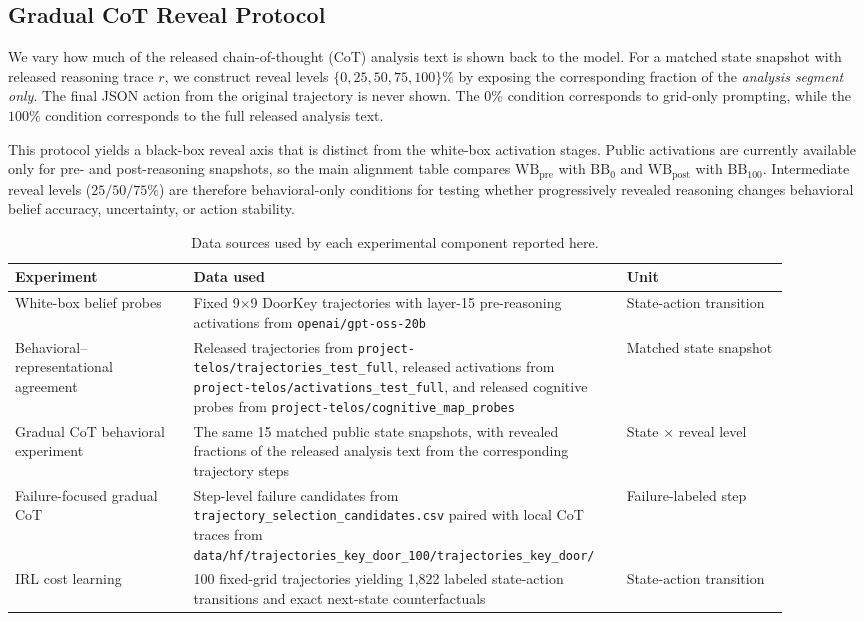 \documentclass[final]{sparreport}
\begin{document}
\subsection{Gradual CoT Reveal Protocol}
We vary how much of the released chain-of-thought (CoT) analysis text is shown back to the model. For a matched state snapshot with released reasoning trace $r$, we construct reveal levels $\{0,25,50,75,100\}\%$ by exposing the corresponding fraction of the \emph{analysis segment only}. The final JSON action from the original trajectory is never shown. The $0\%$ condition corresponds to grid-only prompting, while the $100\%$ condition corresponds to the full released analysis text.

This protocol yields a black-box reveal axis that is distinct from the white-box activation stages. Public activations are currently available only for pre- and post-reasoning snapshots, so the main alignment table compares $\mathrm{WB}_{\text{pre}}$ with $\mathrm{BB}_{0}$ and $\mathrm{WB}_{\text{post}}$ with $\mathrm{BB}_{100}$. Intermediate reveal levels ($25/50/75\%$) are therefore behavioral-only conditions for testing whether progressively revealed reasoning changes behavioral belief accuracy, uncertainty, or action stability.

\begin{table}[t]
\centering
\small
\caption{Data sources used by each experimental component reported here.}
\label{tab:behavioral_data_sources}
\begin{tabular}{p{0.22\linewidth}p{0.48\linewidth}p{0.20\linewidth}}
\toprule
\textbf{Experiment} & \textbf{Data used} & \textbf{Unit} \\
\midrule
White-box belief probes & Fixed 9$\times$9 DoorKey trajectories with layer-15 pre-reasoning activations from \texttt{openai/gpt-oss-20b} & State-action transition \\
Behavioral--representational agreement & Released trajectories from \texttt{project-telos/trajectories\_test\_full}, released activations from \texttt{project-telos/activations\_test\_full}, and released cognitive probes from \texttt{project-telos/cognitive\_map\_probes} & Matched state snapshot \\
Gradual CoT behavioral experiment & The same 15 matched public state snapshots, with revealed fractions of the released analysis text from the corresponding trajectory steps & State $\times$ reveal level \\
Failure-focused gradual CoT & Step-level failure candidates from \texttt{trajectory\_selection\_candidates.csv} paired with local CoT traces from \texttt{data/hf/trajectories\_key\_door\_100/trajectories\_key\_door/} & Failure-labeled step \\
IRL cost learning & 100 fixed-grid trajectories yielding 1,822 labeled state-action transitions and exact next-state counterfactuals & State-action transition \\
\bottomrule
\end{tabular}
\end{table}
\end{document}
